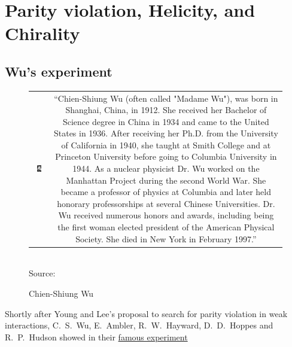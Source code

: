\section{Parity violation, Helicity, and Chirality}

\subsection{Wu's experiment}
\begin{figure}
\caption{Chien-Shiung Wu}
\begin{tabular}{cc}
\parbox{0.32\textwidth}{
\includegraphics[width=0.3\textwidth]{fig/C_P_CP/Wu.jpg}
}&
\parbox{0.66\textwidth}{\textsf{\small
    ``Chien-Shiung Wu (often called "Madame Wu"), was born in Shanghai, China, in 1912. She
    received her Bachelor of Science degree in China in 1934 and came
    to the United States in 1936. After receiving her Ph.D. from the
    University of California in 1940, she taught at Smith College and
    at Princeton University before going to Columbia University in
    1944. As a nuclear physicist Dr. Wu worked on the Manhattan
    Project during the second World War. She became a professor of
    physics at Columbia and later held honorary professorships at
    several Chinese Universities. Dr. Wu received numerous honors and
    awards, including being the first woman elected president of the
    American Physical Society. She died in New York in February 1997.'' 
}}
\end{tabular}
\\  \textsf{Source: }
\end{figure}
 Shortly after Young and Lee's proposal to search for parity violation in weak interactions, C.~S.~Wu, E.~Ambler, R.~W.~Hayward, D.~D.~Hoppes and
 R.~P.~Hudson showed in their
 \href{http://link.aps.org/abstract/PR/v105/p1413}{famous experiment}
